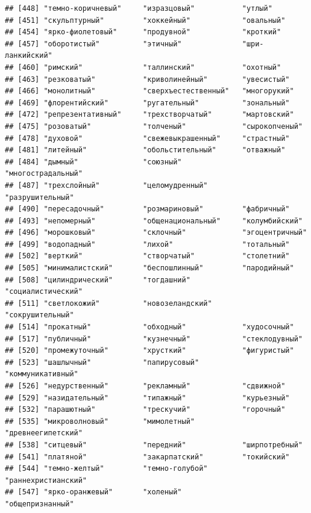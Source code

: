\documentclass[11pt]{article}\usepackage[]{graphicx}\usepackage[]{color}
\makeatletter
\newenvironment{kframe}{%
 \def\at@end@of@kframe{}%
 \ifinner\ifhmode%
  \def\at@end@of@kframe{\end{minipage}}%
  \begin{minipage}{\columnwidth}%
 \fi\fi%
 \def\FrameCommand##1{\hskip\@totalleftmargin \hskip-\fboxsep
 \colorbox{shadecolor}{##1}\hskip-\fboxsep
     \hskip-\linewidth \hskip-\@totalleftmargin \hskip\columnwidth}%
 \MakeFramed {\advance\hsize-\width
   \@totalleftmargin\z@ \linewidth\hsize
   \@setminipage}}%
 {\par\unskip\endMakeFramed%
 \at@end@of@kframe}
\newenvironment{knitrout}{}{} %
\makeatother
\begin{document}
\begin{knitrout}
\begin{kframe}
\begin{verbatim}
## [448] "темно-коричневый"     "изразцовый"           "утлый"               
## [451] "скульптурный"         "хоккейный"            "овальный"            
## [454] "ярко-фиолетовый"      "продувной"            "кроткий"             
## [457] "оборотистый"          "этичный"              "шри-ланкийский"      
## [460] "римский"              "таллинский"           "охотный"             
## [463] "резковатый"           "криволинейный"        "увесистый"           
## [466] "монолитный"           "сверхъестественный"   "многорукий"          
## [469] "флорентийский"        "ругательный"          "зональный"           
## [472] "репрезентативный"     "трехстворчатый"       "мартовский"          
## [475] "розоватый"            "толченый"             "сырокопченый"        
## [478] "духовой"              "свежевыкрашенный"     "страстный"           
## [481] "литейный"             "обольстительный"      "отважный"            
## [484] "дымный"               "союзный"              "многострадальный"    
## [487] "трехслойный"          "целомудренный"        "разрушительный"      
## [490] "пересадочный"         "розмариновый"         "фабричный"           
## [493] "непомерный"           "общенациональный"     "колумбийский"        
## [496] "морошковый"           "склочный"             "эгоцентричный"       
## [499] "водопадный"           "лихой"                "тотальный"           
## [502] "верткий"              "створчатый"           "столетний"           
## [505] "минималистский"       "беспошлинный"         "пародийный"          
## [508] "цилиндрический"       "тогдашний"            "социалистический"    
## [511] "светлокожий"          "новозеландский"       "сокрушительный"      
## [514] "прокатный"            "обходный"             "худосочный"          
## [517] "публичный"            "кузнечный"            "стеклодувный"        
## [520] "промежуточный"        "хрусткий"             "фигуристый"          
## [523] "шашлычный"            "папирусовый"          "коммуникативный"     
## [526] "недурственный"        "рекламный"            "сдвижной"            
## [529] "назидательный"        "типажный"             "курьезный"           
## [532] "парашютный"           "трескучий"            "горочный"            
## [535] "микроволновый"        "мимолетный"           "древнеегипетский"    
## [538] "ситцевый"             "передний"             "ширпотребный"        
## [541] "платяной"             "закарпатский"         "токийский"           
## [544] "темно-желтый"         "темно-голубой"        "раннехристианский"   
## [547] "ярко-оранжевый"       "холеный"              "общепризнанный"      

\end{verbatim}
\end{kframe}
\end{knitrout}
\end{document}

